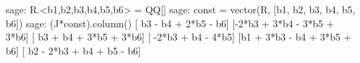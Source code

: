 %
\begin{sageexample}
sage: R.<b1,b2,b3,b4,b5,b6> = QQ[]
sage: const = vector(R, [b1, b2, b3, b4, b5, b6])
sage: (J*const).column()
[       b3 - b4 + 2*b5 - b6]
[-2*b3 + 3*b4 - 3*b5 + 3*b6]
[     b3 + b4 + 3*b5 + 3*b6]
[         -2*b3 + b4 - 4*b5]
[b1 + 3*b3 - b4 + 3*b5 + b6]
[  b2 - 2*b3 + b4 + b5 - b6]
\end{sageexample}
%
\begin{sageverbatim}
\end{sageverbatim}
%















